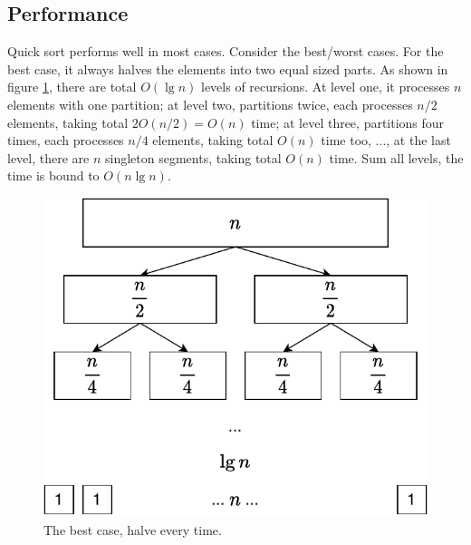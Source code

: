 \documentclass[b5paper]{article}
\begin{document}
\begin{Answer}[ref = {ex:basic-qsort}]
\end{Answer}

\subsection{Performance}
 \label{sec:quick-sort-big-o}

Quick sort performs well in most cases. Consider the best/worst cases. For the best case, it always halves the elements into two equal sized parts. As shown in figure \cref{fig:qsort-best}, there are total $O(\lg n)$ levels of recursions. At level one, it processes $n$ elements with one partition; at level two, partitions twice, each processes $n/2$ elements, taking total $2 O(n/2) = O(n)$ time; at level three, partitions four times, each processes $n/4$ elements, taking total $O(n)$ time too, ..., at the last level, there are $n$ singleton segments, taking total $O(n)$ time. Sum all levels, the time is bound to $O(n \lg n)$.

\begin{figure}[htbp]
 \centering
 \includegraphics[scale=0.55]{img/qsort-best}
 \caption{The best case, halve every time.}
 \label{fig:qsort-best}
\end{figure}
\end{document}

